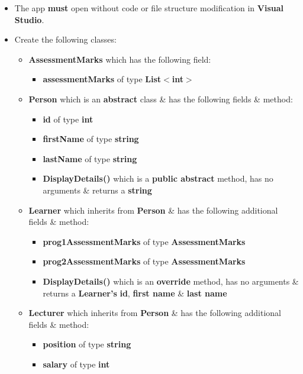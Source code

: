 \documentclass{article}
\begin{document}
\begin{itemize}
    \item The app \textbf{must} open without code or file structure modification in \textbf{Visual Studio}.
    \item Create the following classes:
    \begin{itemize}
        \item \textbf{AssessmentMarks} which has the following field:
        \begin{itemize}
            \item \textbf{assessmentMarks} of type \textbf{List$<$int$>$}
        \end{itemize}
        \item \textbf{Person} which is an \textbf{abstract} class \& has the following fields \& method:
        \begin{itemize}
            \item \textbf{id} of type \textbf{int}
            \item \textbf{firstName} of type \textbf{string}
            \item \textbf{lastName} of type \textbf{string}
            \item \textbf{DisplayDetails()} which is a \textbf{public abstract} method, has no arguments \& returns a \textbf{string}
        \end{itemize}    
        \item \textbf{Learner} which inherits from \textbf{Person} \& has the following additional fields \& method:
        \begin{itemize}
            \item \textbf{prog1AssessmentMarks} of type \textbf{AssessmentMarks}
            \item \textbf{prog2AssessmentMarks} of type \textbf{AssessmentMarks}
            \item \textbf{DisplayDetails()} which is an \textbf{override} method, has no arguments \& returns a \textbf{Learner's} \textbf{id}, \textbf{first name} \& \textbf{last name}
        \end{itemize}
        \item \textbf{Lecturer} which inherits from \textbf{Person} \& has the following additional fields \& method:
        \begin{itemize}
            \item \textbf{position} of type \textbf{string}
            \item \textbf{salary} of type \textbf{int}

\end{itemize}
\end{itemize}
\end{itemize}
\end{document}

